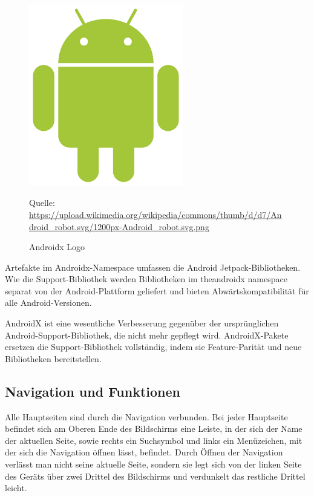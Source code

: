 \documentclass[10pt]{scrartcl}
\newcommand*{\quelle}{%
	\footnotesize Quelle:
}
\begin{document}
\begin{figure}[H]
	\centering
	\includegraphics[width=0.6\textwidth]{Bilder/BibliothekenLogos/AndroidLogo.png}
	\caption{Androidx Logo}
	\quelle\url{https://upload.wikimedia.org/wikipedia/commons/thumb/d/d7/Android_robot.svg/1200px-Android_robot.svg.png}
\end{figure}

Artefakte im Androidx-Namespace umfassen die Android Jetpack-Bibliotheken. Wie die Support-Bibliothek werden Bibliotheken im theandroidx namespace separat von der Android-Plattform geliefert und bieten Abwärtskompatibilität für alle Android-Versionen.

AndroidX ist eine wesentliche Verbesserung gegenüber der ursprünglichen Android-Support-Bibliothek, die nicht mehr gepflegt wird. AndroidX-Pakete ersetzen die Support-Bibliothek vollständig, indem sie Feature-Parität und neue Bibliotheken bereitstellen.


\subsection{Navigation und Funktionen}

Alle Hauptseiten sind durch die Navigation verbunden. Bei jeder Hauptseite befindet sich am Oberen Ende des Bildschirms eine Leiste, in der sich der Name der aktuellen Seite, sowie rechts ein Suchsymbol und  links ein Menüzeichen, mit der sich die Navigation öffnen lässt, befindet. Durch Öffnen der Navigation verlässt man nicht seine aktuelle Seite, sondern sie legt sich von der linken Seite des Geräts über zwei Drittel des Bildschirms und verdunkelt das restliche Drittel leicht. 
\end{document}
